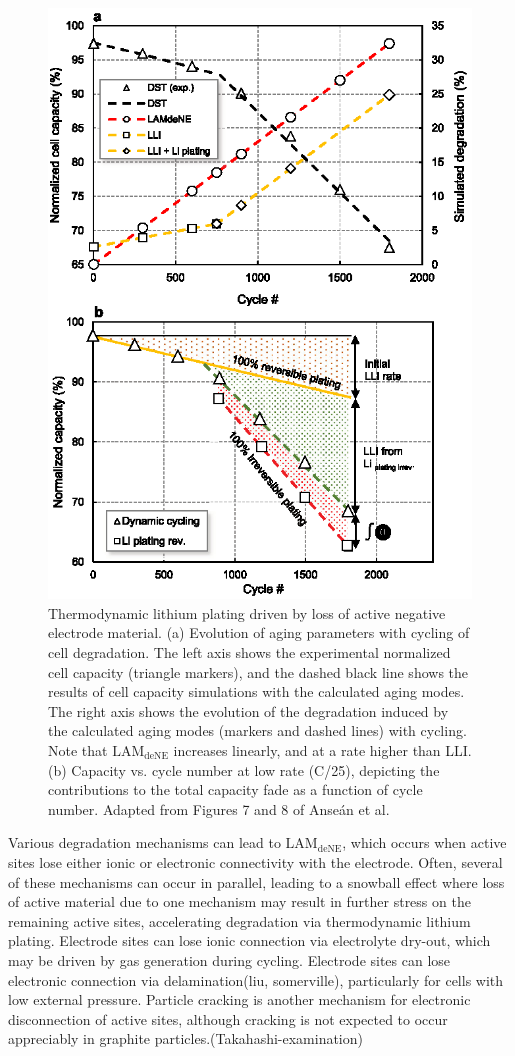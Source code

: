 \documentclass[journal=jpcl, manuscript=article, layout=onecolumn]{achemso}
\begin{document}
\begin{figure}[ht]
    \centering
    \includegraphics[width=0.7\linewidth]{figures/thermo_plating_dubarry.eps}
    \caption{Thermodynamic lithium plating driven by loss of active negative electrode material. (a) Evolution of aging parameters with cycling of cell degradation. The left axis shows the experimental normalized cell capacity (triangle markers), and the dashed black line shows the results of cell capacity simulations with the calculated aging modes. The right axis shows the evolution of the degradation induced by the calculated aging modes (markers and dashed lines) with cycling. Note that $\mathrm{LAM_{deNE}}$ increases linearly, and at a rate higher than LLI.
    (b) Capacity vs. cycle number at low rate (C/25), depicting the contributions to the total capacity fade as a function of cycle number.
    Adapted from Figures 7 and 8 of Anse\'an et al.\cite{ansean_operando_2017}}
    \label{fig:thermo_plating}
\end{figure}

Various degradation mechanisms can lead to $\mathrm{LAM_{deNE}}$, which occurs when active sites lose either ionic or electronic connectivity with the electrode.
Often, several of these mechanisms can occur in parallel, leading to a snowball effect where loss of active material due to one mechanism may result in further stress on the remaining active sites, accelerating degradation via thermodynamic lithium plating.
Electrode sites can lose ionic connection via electrolyte dry-out, which may be driven by gas generation during cycling.\cite{mao_calendar_2017, kupper_end--life_2018}
Electrode sites can lose electronic connection via delamination\cite{cannarella_stress_2014, willenberg_high-precision_2020}(liu, somerville), particularly for cells with low external pressure\cite{cannarella_stress_2014}. Particle cracking is another mechanism for electronic disconnection of active sites, although cracking is not expected to occur appreciably in graphite particles.(Takahashi-examination)
\end{document}
